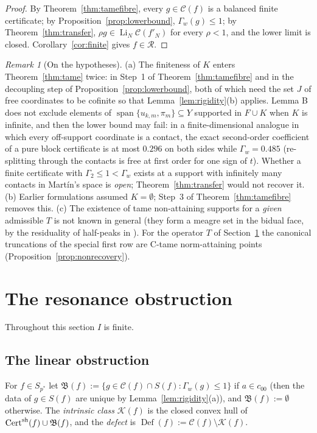 \documentclass[10pt]{amsart}
\theoremstyle{definition}
\theoremstyle{remark}
\newtheorem{remark}[theorem]{Remark}
\newcommand{\spn}{\operatorname{span}}
\newcommand{\Cset}{\mathcal C}
\newcommand{\Cert}{\operatorname{Cert}}
\newcommand{\Li}{\operatorname*{Li}}
\newcommand{\Def}{\operatorname{Def}}
\newcommand{\Rec}{\mathcal R}
\begin{document}
\begin{proof}
By Theorem~\ref{thm:tamefibre}, every $g\in\Cset(f)$ is a balanced finite
certificate; by Proposition~\ref{prop:lowerbound}, $\Gamma_w(g)\le1$; by
Theorem~\ref{thm:transfer}, $\rho g\in\Li_N\Cset(f'_N)$ for every $\rho<1$,
and the lower limit is closed.  Corollary~\ref{cor:finite} gives $f\in\Rec$.
\end{proof}

\begin{remark}[On the hypotheses]\label{rem:kinks}
(a) The finiteness of $K$ enters Theorem~\ref{thm:tame} twice: in Step~1 of
Theorem~\ref{thm:tamefibre} and in the decoupling step of
Proposition~\ref{prop:lowerbound}, both of which need the set $J$ of free
coordinates to be cofinite so that Lemma~\ref{lem:rigidity}(b) applies.
Lemma B does not exclude elements of $\spn\{u_{k,m},\pi_m\}\subseteq Y$
supported in $F\cup K$ when $K$ is infinite, and then the lower bound may
fail: in a finite-dimensional analogue in which every off-support
coordinate is a contact, the exact second-order coefficient of a pure block
certificate is at most $0.296$ on both sides while $\Gamma_w=0.485$
(re-splitting through the contacts is free at first order for one sign of
$t$).  Whether a finite certificate with $\Gamma_2\le1<\Gamma_w$ exists at a
support with infinitely many contacts in Mart\'in's space is \emph{open};
Theorem~\ref{thm:transfer} would not recover it.  (b) Earlier formulations
assumed $K=\emptyset$; Step~3 of Theorem~\ref{thm:tamefibre} removes this.
(c) The existence of tame non-attaining supports for a \emph{given}
admissible $T$ is not known in general (they form a meagre set in the
bidual face, by the residuality of half-peaks in \cite[Section~3]{PrA}).
For the operator $T$ of Section~\ref{sec:resonance} the canonical
truncations of the special first row are C-tame norm-attaining points
(Proposition~\ref{prop:nonrecovery}).
\end{remark}

\section{The resonance obstruction}\label{sec:resonance}

Throughout this section $I$ is finite.

\subsection{The linear obstruction}
For $f\in S_{p^*}$ let $\mathfrak B(f):=\{g\in\Cset(f)\cap S(f):\Gamma_w(g)
\le1\}$ if $a\in c_{00}$ (then the data of $g\in S(f)$ are unique by
Lemma~\ref{lem:rigidity}(a)), and $\mathfrak B(f):=\emptyset$ otherwise.
The \emph{intrinsic class} $\mathcal K(f)$ is the closed convex hull of
$\Cert^{\rm sh}(f)\cup\mathfrak B(f)$, and the \emph{defect} is
$\Def(f):=\Cset(f)\setminus\mathcal K(f)$.
\end{document}
